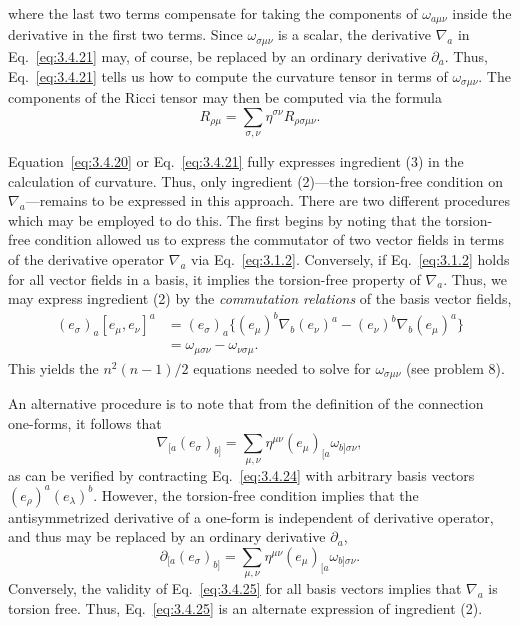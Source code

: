 where the last two terms compensate for taking the components of $\omega_{a\mu\nu}$ inside the
derivative in the first two terms. Since $\omega_{\sigma\mu\nu}$ is a scalar, the derivative $\nabla_a$ in Eq.~\eqref{eq:3.4.21}
may, of course, be replaced by an ordinary derivative $\partial_a$. Thus, Eq.~\eqref{eq:3.4.21}
tells us how to compute the curvature tensor in terms of $\omega_{\sigma\mu\nu}$. The components of the Ricci tensor may then be computed via the formula
\begin{equation}
  R_{\rho\mu}=\sum_{\sigma,\nu}\eta^{\sigma\nu}R_{\rho\sigma\mu\nu}.
  \tag{3.4.22}\label{eq:3.4.22}
\end{equation}

Equation~\eqref{eq:3.4.20} or Eq.~\eqref{eq:3.4.21} fully expresses ingredient (3) in the calculation of curvature. Thus, only ingredient (2)---the torsion-free condition on $\nabla_a$---remains to be expressed in this approach. There are two different procedures which
may be employed to do this. The first begins by noting that the torsion-free condition
allowed us to express the commutator of two vector fields in terms of the derivative
operator $\nabla_a$ via Eq.~\eqref{eq:3.1.2}. Conversely, if Eq.~\eqref{eq:3.1.2} holds for all vector
fields in a basis, it implies the torsion-free property of $\nabla_a$. Thus, we may express
ingredient (2) by the \emph{commutation relations} of the basis vector fields,
\begin{equation}
  \begin{aligned}
    (e_\sigma)_a[e_\mu,e_\nu]^a
    &=(e_\sigma)_a\bigl\{(e_\mu)^b\nabla_b(e_\nu)^a
    -(e_\nu)^b\nabla_b(e_\mu)^a\bigr\}\\
    &=\omega_{\mu\sigma\nu}-\omega_{\nu\sigma\mu}.
  \end{aligned}
  \tag{3.4.23}\label{eq:3.4.23}
\end{equation}
This yields the $n^2(n-1)/2$ equations needed to solve for $\omega_{\sigma\mu\nu}$ (see problem 8).

An alternative procedure is to note that from the definition of the connection
one-forms, it follows that
\begin{equation}
  \nabla_{[a}(e_\sigma)_{b]}
  =\sum_{\mu,\nu}\eta^{\mu\nu}(e_\mu)_{[a}\omega_{b]\sigma\nu},
  \tag{3.4.24}\label{eq:3.4.24}
\end{equation}
as can be verified by contracting Eq.~\eqref{eq:3.4.24} with arbitrary basis vectors
$(e_\rho)^a(e_\lambda)^b$. However, the torsion-free condition implies that the antisymmetrized
derivative of a one-form is independent of derivative operator, and thus may be
replaced by an ordinary derivative $\partial_a$,
\begin{equation}
  \partial_{[a}(e_\sigma)_{b]}
  =\sum_{\mu,\nu}\eta^{\mu\nu}(e_\mu)_{[a}\omega_{b]\sigma\nu}.
  \tag{3.4.25}\label{eq:3.4.25}
\end{equation}
Conversely, the validity of Eq.~\eqref{eq:3.4.25} for all basis vectors implies that $\nabla_a$ is
torsion free. Thus, Eq.~\eqref{eq:3.4.25} is an alternate expression of ingredient (2).

